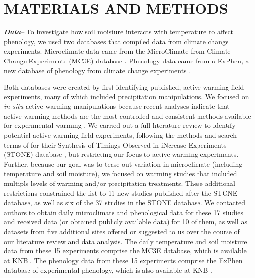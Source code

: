 \documentclass{article}
\begin{document}
\section* {MATERIALS AND METHODS}
\textbf {\emph{Data}}-- To investigate how soil moisture interacts with temperature to affect phenology, we used two databases that compiled data from climate change experiments. Microclimate data came from the  MicroClimate from Climate Change Experiments (MC3E) database \citep{ettinger2018}. Phenology data came from a ExPhen, a new database of phenology from climate change experiments \citep{ettinger2021}. 
\par Both databases were created by first identifying published, active-warming field experiments, many of which included precipitation manipulations. We focused on \textit{in situ} active-warming manipulations because recent analyses indicate that active-warming methods are the most controlled and consistent methods available for experimental warming \citep{kimball2005,kimball2008,aronson2009,wolkovich2012}. We carried out a full literature review to identify potential active-warming field experiments, following the methods and search terms of \citet{wolkovich2012} for their Synthesis of Timings Observed in iNcrease Experiments (STONE) database \citep{wolkovich2012}, but restricting our focus to active-warming experiments. Further, because our goal was to tease out variation in microclimate (including temperature and soil moisture), we focused on warming studies that included multiple levels of warming and/or precipitation treatments. These additional restrictions constrained the list to 11 new studies published after the STONE database, as well as six of the 37 studies in the STONE database. We contacted authors to obtain daily microclimate and phenological data for these 17 studies and received data (or obtained publicly available data) for 10 of them, as well as datasets from five additional sites offered or suggested to us over the course of our literature review and data analysis. The daily temperature and soil moisture data from these 15 experiments comprise the MC3E database, which is available at KNB \citep{ettinger2018}. The phenology data from these 15 experiments comprise the ExPhen database of experimental phenology, which is also available at KNB \citep{ettinger2021}.
\end{document}
